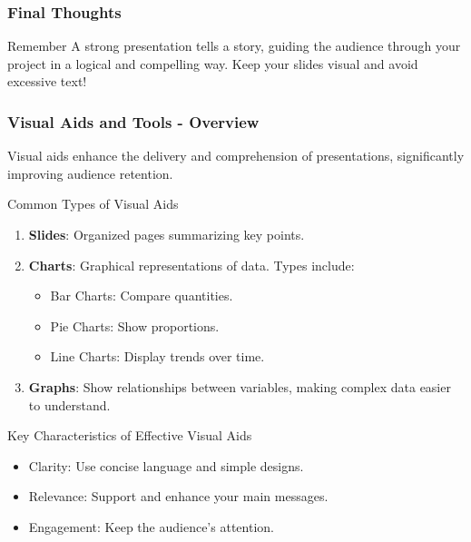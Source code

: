\documentclass[aspectratio=169]{beamer}
\begin{document}
\begin{frame}[fragile]
    \frametitle{Final Thoughts}
    \begin{block}{Remember}
        A strong presentation tells a story, guiding the audience through your project in a logical and compelling way. Keep your slides visual and avoid excessive text!
    \end{block}
\end{frame}

\begin{frame}[fragile]
    \frametitle{Visual Aids and Tools - Overview}
    Visual aids enhance the delivery and comprehension of presentations, significantly improving audience retention.
    
    \begin{block}{Common Types of Visual Aids}
        \begin{enumerate}
            \item \textbf{Slides}: Organized pages summarizing key points.
            \item \textbf{Charts}: Graphical representations of data. Types include:
                \begin{itemize}
                    \item Bar Charts: Compare quantities.
                    \item Pie Charts: Show proportions.
                    \item Line Charts: Display trends over time.
                \end{itemize}
            \item \textbf{Graphs}: Show relationships between variables, making complex data easier to understand.
        \end{enumerate}
    \end{block}
    
    \begin{block}{Key Characteristics of Effective Visual Aids}
        \begin{itemize}
            \item Clarity: Use concise language and simple designs.
            \item Relevance: Support and enhance your main messages.
            \item Engagement: Keep the audience’s attention.
        \end{itemize}
    \end{block}
\end{frame}
\end{document}
